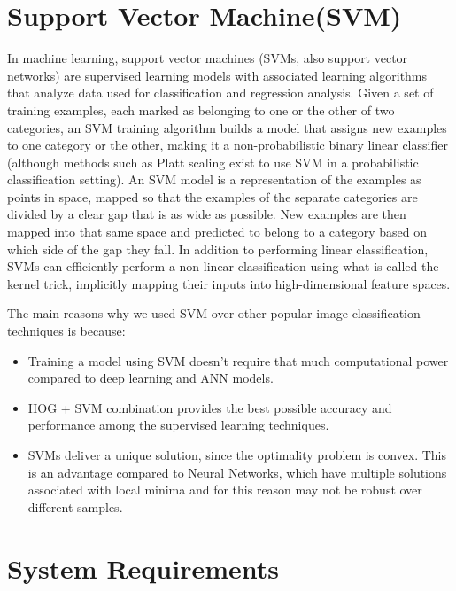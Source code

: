 \documentclass{fisatproject}
\begin{document}
\section{Support Vector Machine(SVM)}
In machine learning, support vector machines\cite{l} (SVMs, also support vector networks) are supervised learning models with associated learning algorithms that analyze data used for classification and regression analysis. Given a set of training examples, each marked as belonging to one or the other of two categories, an SVM training algorithm builds a model that assigns new examples to one category or the other, making it a non-probabilistic binary linear classifier (although methods such as Platt scaling exist to use SVM in a probabilistic classification setting). An SVM model is a representation of the examples as points in space, mapped so that the examples of the separate categories are divided by a clear gap that is as wide as possible. New examples are then mapped into that same space and predicted to belong to a category based on which side of the gap they fall.\newline\newline
In addition to performing linear classification, SVMs can efficiently perform a non-linear classification using what is called the kernel trick, implicitly mapping their inputs into high-dimensional feature spaces.\newline
\begin{flushleft}
The main reasons why we used SVM over other popular image classification techniques is because:
\end{flushleft}
\begin{itemize}
	\item Training a model using SVM doesn't require that much computational power compared to deep learning and ANN models.
	\item HOG + SVM combination provides the best possible accuracy and performance among the supervised learning techniques.
	\item SVMs deliver a unique solution, since the optimality problem is convex. This is an advantage compared
to Neural Networks, which have multiple solutions associated with local minima and for this reason may
not be robust over different samples. 
\end{itemize}

\section{System Requirements}
\end{document}
